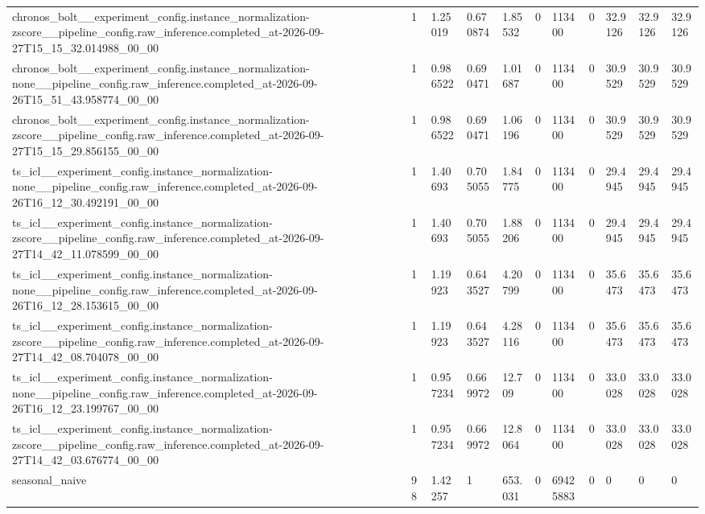 \begin{tabular}{lllllllllll}
chronos\_bolt\_\_experiment\_config.instance\_normalization-zscore\_\_pipeline\_config.raw\_inference.completed\_at-2026-09-27T15\_15\_32.014988\_00\_00 & 1 & 1.25019 & 0.670874 & 1.85532 & 0 & 113400 & 0 & 32.9126 & 32.9126 & 32.9126 \\
chronos\_bolt\_\_experiment\_config.instance\_normalization-none\_\_pipeline\_config.raw\_inference.completed\_at-2026-09-26T15\_51\_43.958774\_00\_00 & 1 & 0.986522 & 0.690471 & 1.01687 & 0 & 113400 & 0 & 30.9529 & 30.9529 & 30.9529 \\
chronos\_bolt\_\_experiment\_config.instance\_normalization-zscore\_\_pipeline\_config.raw\_inference.completed\_at-2026-09-27T15\_15\_29.856155\_00\_00 & 1 & 0.986522 & 0.690471 & 1.06196 & 0 & 113400 & 0 & 30.9529 & 30.9529 & 30.9529 \\
ts\_icl\_\_experiment\_config.instance\_normalization-none\_\_pipeline\_config.raw\_inference.completed\_at-2026-09-26T16\_12\_30.492191\_00\_00 & 1 & 1.40693 & 0.705055 & 1.84775 & 0 & 113400 & 0 & 29.4945 & 29.4945 & 29.4945 \\
ts\_icl\_\_experiment\_config.instance\_normalization-zscore\_\_pipeline\_config.raw\_inference.completed\_at-2026-09-27T14\_42\_11.078599\_00\_00 & 1 & 1.40693 & 0.705055 & 1.88206 & 0 & 113400 & 0 & 29.4945 & 29.4945 & 29.4945 \\
ts\_icl\_\_experiment\_config.instance\_normalization-none\_\_pipeline\_config.raw\_inference.completed\_at-2026-09-26T16\_12\_28.153615\_00\_00 & 1 & 1.19923 & 0.643527 & 4.20799 & 0 & 113400 & 0 & 35.6473 & 35.6473 & 35.6473 \\
ts\_icl\_\_experiment\_config.instance\_normalization-zscore\_\_pipeline\_config.raw\_inference.completed\_at-2026-09-27T14\_42\_08.704078\_00\_00 & 1 & 1.19923 & 0.643527 & 4.28116 & 0 & 113400 & 0 & 35.6473 & 35.6473 & 35.6473 \\
ts\_icl\_\_experiment\_config.instance\_normalization-none\_\_pipeline\_config.raw\_inference.completed\_at-2026-09-26T16\_12\_23.199767\_00\_00 & 1 & 0.957234 & 0.669972 & 12.709 & 0 & 113400 & 0 & 33.0028 & 33.0028 & 33.0028 \\
ts\_icl\_\_experiment\_config.instance\_normalization-zscore\_\_pipeline\_config.raw\_inference.completed\_at-2026-09-27T14\_42\_03.676774\_00\_00 & 1 & 0.957234 & 0.669972 & 12.8064 & 0 & 113400 & 0 & 33.0028 & 33.0028 & 33.0028 \\
seasonal\_naive & 98 & 1.42257 & 1 & 653.031 & 0 & 69425883 & 0 & 0 & 0 & 0 \\
\bottomrule
\end{tabular}
